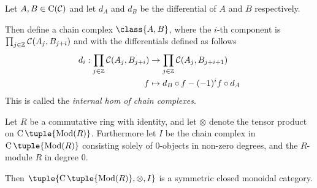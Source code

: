             


\begin{definition}
    \label{def:internal_hom_of_chain_complexes}
    Let \( A, B \in \operatorname{C}({\mathcal{C}}) \) and let \( d_A \) and \( d_B \) be the differential of \( A \) and \( B \) respectively.

    Then define a chain complex \( \class{ A, B } \), where the \( i \)-th component is \( \prod_{j \in {\mathbb{Z}}} {\mathcal{C}}(A_j, B_{j + i}) \) and with the differentials defined as follows
    \begin{align*}
        d_i: \prod_{j \in {\mathbb{Z}}} {\mathcal{C}}(A_j, B_{j + i}) &\to \prod_{j \in {\mathbb{Z}}} {\mathcal{C}}(A_j, B_{j + i + 1}) \\
        f &\mapsto d_B \circ f - (-1)^i f \circ d_A
    \end{align*}
    This is called the \emph{internal hom of chain complexes}.
\end{definition}

\begin{fact}[nlab]
    Let \( R \) be a commutative ring with identity, and let \( \otimes \) denote the tensor product on \( \C \tuple{\Mod(R)} \). Furthermore let \( I \) be the chain complex in \( \C \tuple{\Mod(R)} \) consisting solely of \( 0 \)-objects in non-zero degrees, and the \( R \)-module \( R \) in degree 0. 

    Then \( \tuple{\C \tuple{\Mod(R)}, \otimes, I} \) is a symmetric closed monoidal category.
\end{fact}

